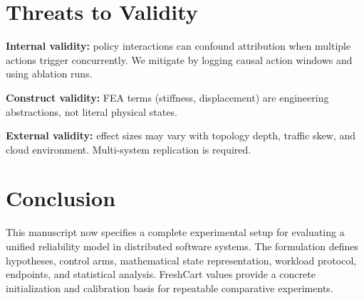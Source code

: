 \documentclass[conference]{IEEEtran}
\begin{document}
\section{Threats to Validity}
\textbf{Internal validity:} policy interactions can confound attribution when multiple actions trigger concurrently. We mitigate by logging causal action windows and using ablation runs.

\textbf{Construct validity:} FEA terms (stiffness, displacement) are engineering abstractions, not literal physical states.

\textbf{External validity:} effect sizes may vary with topology depth, traffic skew, and cloud environment. Multi-system replication is required.

\section{Conclusion}
This manuscript now specifies a complete experimental setup for evaluating a unified reliability model in distributed software systems. The formulation defines hypotheses, control arms, mathematical state representation, workload protocol, endpoints, and statistical analysis. FreshCart values provide a concrete initialization and calibration basis for repeatable comparative experiments.
\end{document}
